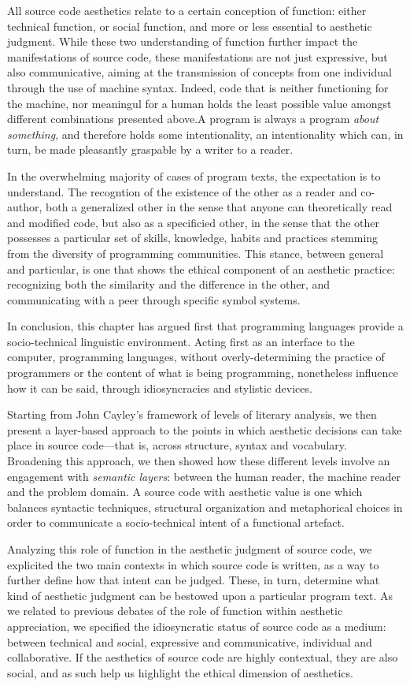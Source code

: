 All source code aesthetics relate to a certain conception of function: either technical function, or social function, and more or less essential to aesthetic judgment. While these two understanding of function further impact the manifestations of source code, these manifestations are not just expressive, but also communicative, aiming at the transmission of concepts from one individual through the use of machine syntax. Indeed, code that is neither functioning for the machine, nor meaningul for a human holds the least possible value amongst different combinations presented above.A program is always a program \emph{about something}, and therefore holds some intentionality, an intentionality which can, in turn, be made pleasantly graspable by a writer to a reader.

In the overwhelming majority of cases of program texts, the expectation is to understand. The recogntion of the existence of the other as a reader and co-author, both a generalized other in the sense that anyone can theoretically read and modified code, but also as a specificied other, in the sense that the other possesses a particular set of skills, knowledge, habits and practices stemming from the diversity of programming communities. This stance, between general and particular, is one that shows the ethical component of an aesthetic practice: recognizing both the similarity and the difference in the other, and communicating with a peer through specific symbol systems.

\spacer

In conclusion, this chapter has argued first that programming languages provide a socio-technical linguistic environment. Acting first as an interface to the computer, programming languages, without overly-determining the practice of programmers or the content of what is being programming, nonetheless influence how it can be said, through idiosyncracies and stylistic devices.

Starting from John Cayley's framework of levels of literary analysis, we then present a layer-based approach to the points in which aesthetic decisions can take place in source code—that is, across structure, syntax and vocabulary. Broadening this approach, we then showed how these different levels involve an engagement with \emph{semantic layers}: between the human reader, the machine reader and the problem domain. A source code with aesthetic value is one which balances syntactic techniques, structural organization and metaphorical choices in order to communicate a socio-technical intent of a functional artefact.

Analyzing this role of function in the aesthetic judgment of source code, we explicited the two main contexts in which source code is written, as a way to further define how that intent can be judged. These, in turn, determine what kind of aesthetic judgment can be bestowed upon a particular program text. As we related to previous debates of the role of function within aesthetic appreciation, we specified the idiosyncratic status of source code as a medium: between technical and social, expressive and communicative, individual and collaborative. If the aesthetics of source code are highly contextual, they are also social, and as such help us highlight the ethical dimension of aesthetics.